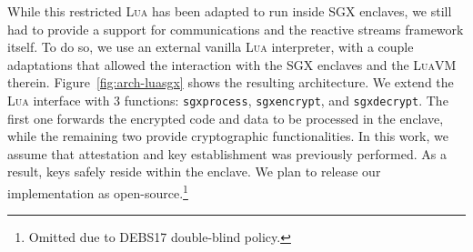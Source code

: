 While this restricted \textsc{Lua} has been adapted to run inside SGX enclaves, we still had to provide a support for communications and the reactive streams framework itself.
To do so, we use an external vanilla \textsc{Lua} interpreter, with a couple adaptations that allowed the interaction with the SGX enclaves and the \textsc{LuaVM} therein.
Figure~\ref{fig:arch-luasgx} shows the resulting architecture.
We extend the \textsc{Lua} interface with 3 functions: \texttt{sgxprocess}, \texttt{sgxencrypt}, and \texttt{sgxdecrypt}.
The first one forwards the encrypted code and data to be processed in the enclave, while the remaining two provide cryptographic functionalities.
In this work, we assume that attestation and key establishment was previously performed.
As a result, keys safely reside within the enclave.
We plan to release our implementation as open-source.\footnote{Omitted due to DEBS17 double-blind policy.}
